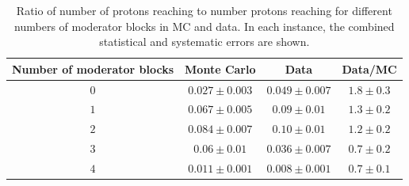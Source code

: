 \begin{table}
  \centering
  \caption[Comparison of number of protons reaching \SThree and \SFour in data and Monte Carlo]{Ratio of number of protons reaching \SFour to number protons reaching \SThree for different numbers of moderator blocks in MC and data. In each instance, the combined statistical and systematic errors are shown.}
  \begin{tabular}{c|c c c}
    \hline
    \hline
    Number of moderator blocks & Monte Carlo & Data & Data/MC\\
    \hline
    $0$ & $0.027 \pm 0.003$ & $0.049 \pm 0.007$ & $1.8 \pm 0.3$ \\
    $1$ & $0.067 \pm 0.005$ & $0.09 \pm 0.01$ & $1.3 \pm 0.2$ \\
    $2$ & $0.084 \pm 0.007$ & $0.10 \pm 0.01$ & $1.2 \pm 0.2$ \\
    $3$ & $0.06 \pm 0.01$ & $0.036 \pm 0.007$ & $0.7 \pm 0.2$ \\
    $4$ & $0.011 \pm 0.001$ & $0.008 \pm 0.001$ & $0.7 \pm 0.1$ \\
    \hline
  \end{tabular}
  \label{tab:s3s4Ratios}
\end{table}

